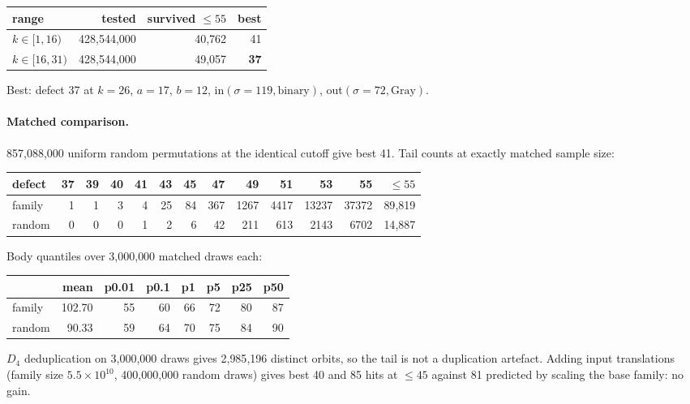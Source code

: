 \documentclass[11pt,a4paper]{article}
\theoremstyle{definition}
\begin{document}
\begin{center}
\begin{tabular}{@{}lrrr@{}}
\toprule
range & tested & survived $\le55$ & best \\
\midrule
$k\in[1,16)$ & 428{,}544{,}000 & 40{,}762 & 41 \\
$k\in[16,31)$ & 428{,}544{,}000 & 49{,}057 & \textbf{37} \\
\bottomrule
\end{tabular}
\end{center}

Best: defect 37 at $k=26$, $a=17$, $b=12$, in$(\sigma=119,\text{binary})$,
out$(\sigma=72,\text{Gray})$.

\paragraph{Matched comparison.} 857{,}088{,}000 uniform random permutations at the
identical cutoff give best 41. Tail counts at exactly matched sample size:

\begin{center}
\begin{tabular}{@{}lrrrrrrrrrrrr@{}}
\toprule
defect & 37 & 39 & 40 & 41 & 43 & 45 & 47 & 49 & 51 & 53 & 55 & $\le55$ \\
\midrule
family & 1 & 1 & 3 & 4 & 25 & 84 & 367 & 1267 & 4417 & 13237 & 37372 & 89{,}819 \\
random & 0 & 0 & 0 & 1 & 2 & 6 & 42 & 211 & 613 & 2143 & 6702 & 14{,}887 \\
\bottomrule
\end{tabular}
\end{center}

Body quantiles over 3{,}000{,}000 matched draws each:

\begin{center}
\begin{tabular}{@{}lrrrrrrr@{}}
\toprule
& mean & p0.01 & p0.1 & p1 & p5 & p25 & p50 \\
\midrule
family & 102.70 & 55 & 60 & 66 & 72 & 80 & 87 \\
random & 90.33 & 59 & 64 & 70 & 75 & 84 & 90 \\
\bottomrule
\end{tabular}
\end{center}

$D_4$ deduplication on 3{,}000{,}000 draws gives 2{,}985{,}196 distinct orbits,
so the tail is not a duplication artefact. Adding input translations (family
size $5.5\times10^{10}$, 400{,}000{,}000 random draws) gives best 40 and 85 hits
at $\le45$ against 81 predicted by scaling the base family: no gain.
\end{document}
